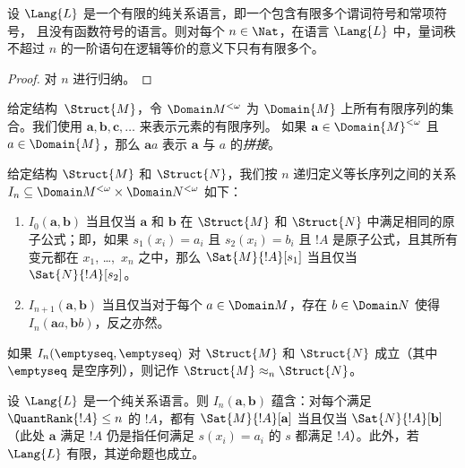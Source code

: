 \documentclass[../../../include/open-logic-section]{subfiles}
\begin{document}
\begin{prop}
  设 $\Lang{L}$ 是一个有限的纯关系语言，即一个包含有限多个谓词符号和常项符号，
  且没有函数符号的语言。则对每个 $n \in \Nat$，在语言
  $\Lang{L}$ 中，量词秩不超过 $n$ 的一阶语句在逻辑等价的意义下只有有限多个。
\end{prop}

\begin{proof}
  对 $n$ 进行归纳。
\end{proof}

\begin{defn}
  给定结构~$\Struct{M}$，令 $\Domain M^{<\omega}$ 为 $\Domain{M}$ 上所有有限序列的集合。我们使用 $\mathbf{a},
  \mathbf{b}, \mathbf{c}, \ldots$ 来表示元素的有限序列。
  如果 $\mathbf{a} \in \Domain{M}^{<\omega}$ 且 $a \in \Domain{M}$，那么 $\mathbf{a}a$ 表示 $\mathbf{a}$ 与 $a$ 的\emph{拼接}。
\end{defn}

\begin{defn}
  给定结构 $\Struct{M}$ 和 $\Struct{N}$，我们按 $n$ 递归定义等长序列之间的关系 $I_n \subseteq \Domain M^{<\omega} \times \Domain N^{<\omega}$ 如下：
   \begin{enumerate}
   \item $I_0(\mathbf{a},\mathbf{b})$ 当且仅当 $\mathbf{a}$ 和 $\mathbf{b}$ 在 $\Struct{M}$ 和 $\Struct{N}$ 中满足相同的原子公式；即，如果 $s_1(x_i) = a_i$ 且 $s_2(x_i) =
     b_i$ 且 $!A$ 是原子公式，且其所有变元都在 $x_1$, \dots,~$x_n$ 之中，那么 $\Sat{M}{!A}[s_1]$ 当且仅当~$\Sat{N}{!A}[s_2]$。
   \item $I_{n+1} (\mathbf{a},\mathbf{b})$ 当且仅当对于每个 $a\in \Domain M$，存在 $b\in \Domain N$ 使得 $I_n
     (\mathbf{a}a,\mathbf{b}b)$，反之亦然。
   \end{enumerate}
\end{defn}


\begin{defn}
  如果 $I_n(\emptyseq,\emptyseq)$ 对 $\Struct{M}$ 和 $\Struct{N}$ 成立（其中 $\emptyseq$ 是空序列），则记作 $\Struct{M} \approx_n \Struct{N}$。
\end{defn}

\begin{thm}
  设 $\Lang{L}$ 是一个纯关系语言。则 $I_n
  (\mathbf{a},\mathbf{b})$ 蕴含：对每个满足 $\QuantRank{!A} \le n$ 的 $!A$，都有 $\Sat{M}{!A}[\mathbf{a}]$ 当且仅当 $\Sat{N}{!A}[\mathbf{b}]$（此处 $\mathbf{a}$ 满足 $!A$ 仍是指任何满足 $s(x_i) = a_i$ 的 $s$ 都满足 $!A$）。此外，若 $\Lang{L}$ 有限，其逆命题也成立。
\end{thm}
\end{document}
